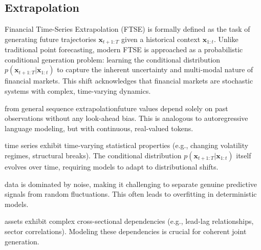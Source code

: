\subsection{Extrapolation}
\label{sec:extrapolation}

Financial Time-Series Extrapolation (FTSE) is formally defined as the task of generating future trajectories $\mathbf{x}_{t+1:T}$ given a historical context $\mathbf{x}_{1:t}$. Unlike traditional point forecasting, modern FTSE is approached as a probabilistic conditional generation problem: learning the conditional distribution $p(\mathbf{x}_{t+1:T} | \mathbf{x}_{1:t})$ to capture the inherent uncertainty and multi-modal nature of financial markets. This shift acknowledges that financial markets are stochastic systems with complex, time-varying dynamics.

from general sequence extrapolationfuture values depend solely on past observations without any look-ahead bias. This is analogous to autoregressive language modeling, but with continuous, real-valued tokens.

time series exhibit time-varying statistical properties (e.g., changing volatility regimes, structural breaks). The conditional distribution $p(\mathbf{x}_{t+1:T} | \mathbf{x}_{1:t})$ itself evolves over time, requiring models to adapt to distributional shifts.

data is dominated by noise, making it challenging to separate genuine predictive signals from random fluctuations. This often leads to overfitting in deterministic models.

assets exhibit complex cross-sectional dependencies (e.g., lead-lag relationships, sector correlations). Modeling these dependencies is crucial for coherent joint generation.

